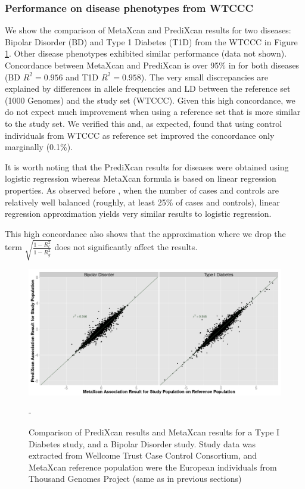 \documentclass[10pt]{article}
\begin{document}
\subsubsection*{Performance on disease phenotypes from WTCCC}

We show the comparison of MetaXcan and PrediXcan results for two diseases: Bipolar Disorder (BD) and Type 1 Diabetes (T1D) from the WTCCC in Figure \ref{fig:BDT1DMP}. Other disease phenotypes exhibited similar performance (data not shown). Concordance between MetaXcan and PrediXcan is over 95\% in for both diseases (BD $R^2=0.956$ and T1D $R^2=0.958$). The very small discrepancies are explained by differences in allele frequencies and LD between the reference set (1000 Genomes) and the study set (WTCCC). Given this high concordance, we do not expect much improvement when using a reference set that is more similar to the study set. We verified this and, as expected, found that using control individuals from WTCCC as reference set improved the concordance only marginally (0.1\%).

It is worth noting that the PrediXcan results for diseases were obtained using logistic regression whereas MetaXcan formula is based on linear regression properties. As observed before \cite{Zhou2013}, when the number of cases and controls are relatively well balanced (roughly, at least 25\% of cases and controls), linear regression approximation yields very similar results to logistic regression.

This high concordance also shows that the approximation where we drop the term $\sqrt{\frac{1-R_l^2}{1-R_g^2}}$ does not significantly affect the results.

\begin{figure}
\includegraphics[width=\textwidth]{plots/Fig5-BDT1D.png}
\caption{Comparison of PrediXcan results and MetaXcan results for a Type I Diabetes study, and a Bipolar Disorder study.
Study data was extracted from Wellcome Trust Case Control Consortium,
and MetaXcan reference population were the European individuals from Thousand Genomes Project
(same as in previous sections) }
-\label{fig:BDT1DMP}
\end{figure}
\end{document}
